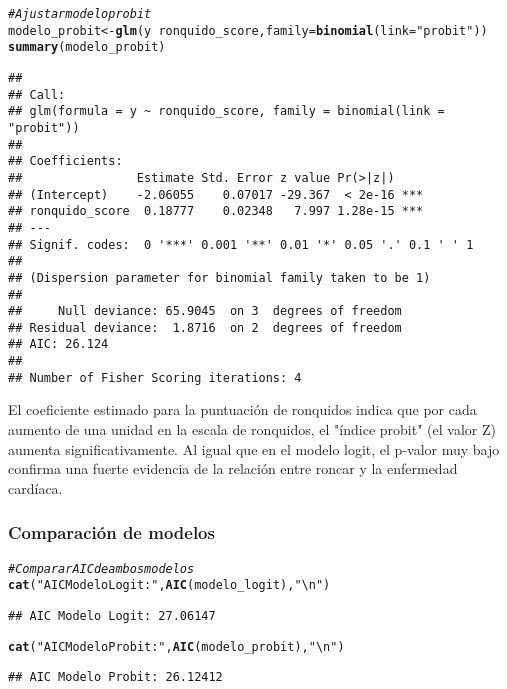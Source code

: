 \documentclass[paper=letter, fontsize=11pt]{scrartcl}\usepackage[]{graphicx}\usepackage[]{xcolor}
\makeatletter
\newcommand{\hlsng}[1]{\textcolor[rgb]{0.192,0.494,0.8}{#1}}%
\newcommand{\hlcom}[1]{\textcolor[rgb]{0.678,0.584,0.686}{\textit{#1}}}%
\newcommand{\hlopt}[1]{\textcolor[rgb]{0,0,0}{#1}}%
\newcommand{\hldef}[1]{\textcolor[rgb]{0.345,0.345,0.345}{#1}}%
\newcommand{\hlkwb}[1]{\textcolor[rgb]{0.69,0.353,0.396}{#1}}%
\newcommand{\hlkwc}[1]{\textcolor[rgb]{0.333,0.667,0.333}{#1}}%
\newcommand{\hlkwd}[1]{\textcolor[rgb]{0.737,0.353,0.396}{\textbf{#1}}}%
\newenvironment{kframe}{%
 \def\at@end@of@kframe{}%
 \ifinner\ifhmode%
  \def\at@end@of@kframe{\end{minipage}}%
  \begin{minipage}{\columnwidth}%
 \fi\fi%
 \def\FrameCommand##1{\hskip\@totalleftmargin \hskip-\fboxsep
 \colorbox{shadecolor}{##1}\hskip-\fboxsep
     \hskip-\linewidth \hskip-\@totalleftmargin \hskip\columnwidth}%
 \MakeFramed {\advance\hsize-\width
   \@totalleftmargin\z@ \linewidth\hsize
   \@setminipage}}%
 {\par\unskip\endMakeFramed%
 \at@end@of@kframe}
\newenvironment{knitrout}{}{} %
\numberwithin{equation}{problemcounter} %
\numberwithin{figure}{problemcounter} %
\numberwithin{table}{problemcounter} %
\numberwithin{subsection}{problemcounter}
\makeatother
\begin{document}
\begin{knitrout}
\color{fgcolor}\begin{kframe}
\begin{alltt}
\hlcom{# Ajustar modelo probit}
\hldef{modelo_probit} \hlkwb{<-} \hlkwd{glm}\hldef{(y} \hlopt{~} \hldef{ronquido_score,} \hlkwc{family} \hldef{=} \hlkwd{binomial}\hldef{(}\hlkwc{link} \hldef{=} \hlsng{"probit"}\hldef{))}
\hlkwd{summary}\hldef{(modelo_probit)}
\end{alltt}
\begin{verbatim}
## 
## Call:
## glm(formula = y ~ ronquido_score, family = binomial(link = "probit"))
## 
## Coefficients:
##                Estimate Std. Error z value Pr(>|z|)    
## (Intercept)    -2.06055    0.07017 -29.367  < 2e-16 ***
## ronquido_score  0.18777    0.02348   7.997 1.28e-15 ***
## ---
## Signif. codes:  0 '***' 0.001 '**' 0.01 '*' 0.05 '.' 0.1 ' ' 1
## 
## (Dispersion parameter for binomial family taken to be 1)
## 
##     Null deviance: 65.9045  on 3  degrees of freedom
## Residual deviance:  1.8716  on 2  degrees of freedom
## AIC: 26.124
## 
## Number of Fisher Scoring iterations: 4
\end{verbatim}
\end{kframe}
\end{knitrout}

El coeficiente estimado para la puntuación de ronquidos indica que por cada aumento de una unidad en la escala de ronquidos, el "índice probit" (el valor Z) aumenta significativamente. Al igual que en el modelo logit, el p-valor muy bajo confirma una fuerte evidencia de la relación entre roncar y la enfermedad cardíaca.

\subsubsection*{Comparación de modelos}

\begin{knitrout}
\color{fgcolor}\begin{kframe}
\begin{alltt}
\hlcom{# Comparar AIC de ambos modelos}
\hlkwd{cat}\hldef{(}\hlsng{"AIC Modelo Logit:"}\hldef{,} \hlkwd{AIC}\hldef{(modelo_logit),} \hlsng{"\textbackslash{}n"}\hldef{)}
\end{alltt}
\begin{verbatim}
## AIC Modelo Logit: 27.06147
\end{verbatim}
\begin{alltt}
\hlkwd{cat}\hldef{(}\hlsng{"AIC Modelo Probit:"}\hldef{,} \hlkwd{AIC}\hldef{(modelo_probit),} \hlsng{"\textbackslash{}n"}\hldef{)}
\end{alltt}
\begin{verbatim}
## AIC Modelo Probit: 26.12412
\end{verbatim}
\end{kframe}
\end{knitrout}
\end{document}
